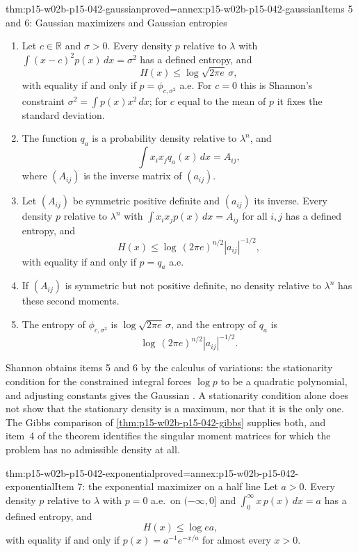 \begin{hbtheorem}{thm:p15-w02b-p15-042-gaussian}{proved=annex:p15-w02b-p15-042-gaussian}{Items 5 and 6: Gaussian maximizers and Gaussian entropies}
\begin{enumerate}
\item Let \(c\in\mathbb R\) and \(\sigma>0\). Every density \(p\) relative to
      \(\lambda\) with \(\int(x-c)^2p(x)\,dx=\sigma^2\) has a defined
      entropy, and
      \[
       H(x)\leq\log\sqrt{2\pi e}\,\sigma ,
      \]
      with equality if and only if \(p=\phi_{c,\sigma^2}\) a.e.
      For \(c=0\) this is Shannon's constraint \(\sigma^2=\int p(x)x^2\,dx\);
      for \(c\) equal to the mean of \(p\) it fixes the standard deviation.
\item The function \(q_a\) is a probability density relative to
      \(\lambda^n\), and
      \[
       \int x_ix_jq_a(x)\,dx=A_{ij},
      \]
      where \((A_{ij})\) is the inverse matrix of \((a_{ij})\).
\item Let \((A_{ij})\) be symmetric positive definite and \((a_{ij})\) its
      inverse. Every density \(p\) relative to \(\lambda^n\) with
      \(\int x_ix_jp(x)\,dx=A_{ij}\) for all \(i,j\) has a defined entropy,
      and
      \[
       H(x)\leq\log\,(2\pi e)^{n/2}|a_{ij}|^{-1/2},
      \]
      with equality if and only if \(p=q_a\) a.e.
\item If \((A_{ij})\) is symmetric but not positive definite, no density
      relative to \(\lambda^n\) has these second moments.
\item The entropy of \(\phi_{c,\sigma^2}\) is
      \(\log\sqrt{2\pi e}\,\sigma\), and the entropy of \(q_a\) is
      \[
       \log\,(2\pi e)^{n/2}|a_{ij}|^{-1/2}.
      \]
\end{enumerate}
\end{hbtheorem}

Shannon obtains items 5 and 6 by the calculus of variations: the stationarity
condition for the constrained integral forces \(\log p\) to be a quadratic
polynomial, and adjusting constants gives the Gaussian
\cite[sec.~20, pp.~36--37]{Shannon1948MathematicalTheory}. A stationarity condition
alone does not show that the stationary density is a maximum, nor that it is
the only one. The Gibbs comparison of \cref{thm:p15-w02b-p15-042-gibbs}
supplies both, and item~4 of the theorem identifies the singular moment matrices for which
the problem has no admissible density at all.

\begin{hbtheorem}{thm:p15-w02b-p15-042-exponential}{proved=annex:p15-w02b-p15-042-exponential}{Item 7: the exponential maximizer on a half line}
Let \(a>0\). Every density \(p\) relative to \(\lambda\) with \(p=0\) a.e.\
on \((-\infty,0]\) and \(\int_0^\infty x\,p(x)\,dx=a\) has a defined entropy,
and
\[
 H(x)\leq\log ea ,
\]
with equality if and only if \(p(x)=a^{-1}e^{-x/a}\) for almost every
\(x>0\).
\end{hbtheorem}

